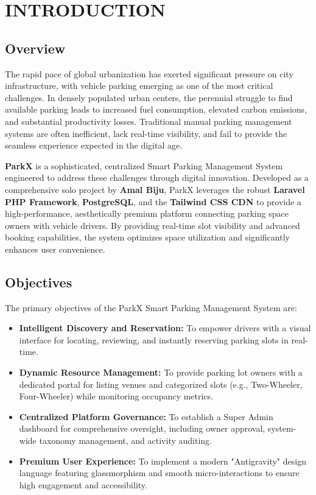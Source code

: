 \chapter{INTRODUCTION}

\section{Overview}
The rapid pace of global urbanization has exerted significant pressure on city infrastructure, with vehicle parking emerging as one of the most critical challenges. In densely populated urban centers, the perennial struggle to find available parking leads to increased fuel consumption, elevated carbon emissions, and substantial productivity losses. Traditional manual parking management systems are often inefficient, lack real-time visibility, and fail to provide the seamless experience expected in the digital age.

\textbf{ParkX} is a sophisticated, centralized Smart Parking Management System engineered to address these challenges through digital innovation. Developed as a comprehensive solo project by \textbf{Amal Biju}, ParkX leverages the robust \textbf{Laravel PHP Framework}, \textbf{PostgreSQL}, and the \textbf{Tailwind CSS CDN} to provide a high-performance, aesthetically premium platform connecting parking space owners with vehicle drivers. By providing real-time slot visibility and advanced booking capabilities, the system optimizes space utilization and significantly enhances user convenience.

\section{Objectives}
The primary objectives of the ParkX Smart Parking Management System are:
\begin{itemize}
    \item \textbf{Intelligent Discovery and Reservation:} To empower drivers with a visual interface for locating, reviewing, and instantly reserving parking slots in real-time.
    \item \textbf{Dynamic Resource Management:} To provide parking lot owners with a dedicated portal for listing venues and categorized slots (e.g., Two-Wheeler, Four-Wheeler) while monitoring occupancy metrics.
    \item \textbf{Centralized Platform Governance:} To establish a Super Admin dashboard for comprehensive oversight, including owner approval, system-wide taxonomy management, and activity auditing.
    \item \textbf{Premium User Experience:} To implement a modern "Antigravity" design language featuring glassmorphism and smooth micro-interactions to ensure high engagement and accessibility.
\end{itemize}

